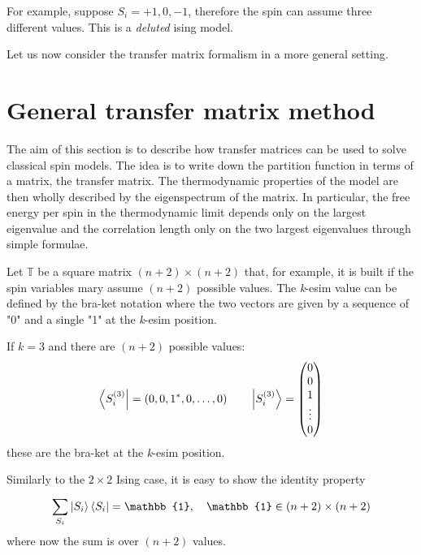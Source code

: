 \documentclass[../main/main.tex]{subfiles}
\begin{document}
\begin{example}{}{}
  For example, suppose \( S_i = +1,0,-1 \), therefore the spin can assume three different values.   This is a \emph{deluted} ising model.
\end{example}
Let us now consider the transfer matrix formalism in a more general setting.

\section{General transfer matrix method}
The aim of this section is to describe how transfer matrices can be used to solve classical spin models. The idea is to write down the partition function in terms of a matrix, the transfer matrix. The thermodynamic properties of the model are then wholly described by the eigenspectrum of the matrix. In particular, the free energy per spin in the thermodynamic limit depends only on the largest eigenvalue and the correlation length only on the two largest eigenvalues through simple formulae.

Let \( \mathbb{T} \) be a square matrix \( (n+2) \times (n+2) \) that, for example, it is built if the spin variables mary assume \( (n+2) \) possible values. The \emph{k}-esim value can be defined by the bra-ket notation where the two vectors are given by a sequence of "0" and a single "1" at the \emph{k}-esim  position.
\begin{example}{}{}
If \( k=3 \) and there are \( (n+2) \)  possible values:
  \begin{equation*}
    \bra{S_i^{(3)}} = (0,0,1^*,0,\dots,0) \qquad   \ket{S_i^{(3)}} = \begin{pmatrix}
      0 \\
      0 \\
      1 \\
      \vdots \\
      0
      \end{pmatrix}
  \end{equation*}
these are the bra-ket at the \emph{k}-esim position.
\end{example}
Similarly to the \( 2 \times 2 \) Ising case, it is easy to show the identity property
\begin{equation}
  \sum_{S_i}^{} \ket{S_i} \bra{S_i} = \mathbb{1}, \quad \mathbb{1} \in (n+2)\times(n+2)
\end{equation}
where now the sum is over \( (n+2) \) values.
\end{document}
